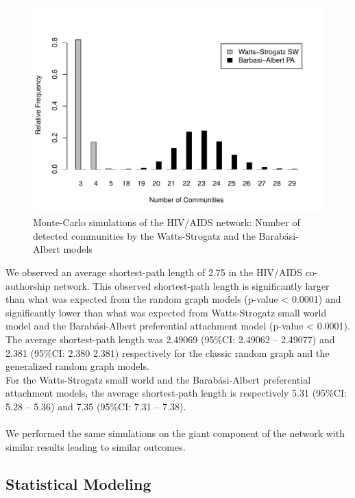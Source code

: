 \begin{figure}[h!]
\centering
\includegraphics[scale=0.65]{Chapters/hiv/mechanisticComm}
\caption{Monte-Carlo simulations of the HIV/AIDS network: Number of detected communities by the Watts-Strogatz and the Barab\'asi-Albert models}
\label{hiv_fig4}
\end{figure}

We observed an average shortest-path length of 2.75 in the HIV/AIDS co-authorship network. This observed shortest-path length is significantly larger than what was expected from the random graph models (p-value < 0.0001) and significantly lower than what was expected from Watts-Strogatz small world model and the Barab\'asi-Albert preferential attachment model (p-value < 0.0001).\\The average shortest-path length was 2.49069 (95\%CI: 2.49062 -- 2.49077) and 2.381 (95\%CI: 2.380 2.381) respectively for the classic random graph and the generalized random graph models.\\For the Watts-Strogatz small world and the Barab\'asi-Albert preferential attachment models, the average shortest-path length is respectively 5.31 (95\%CI: 5.28 -- 5.36) and 7.35 (95\%CI: 7.31 -- 7.38).\\~\\
We performed the same simulations on the giant component of the network with similar results leading to similar outcomes.

\subsection{Statistical Modeling}

